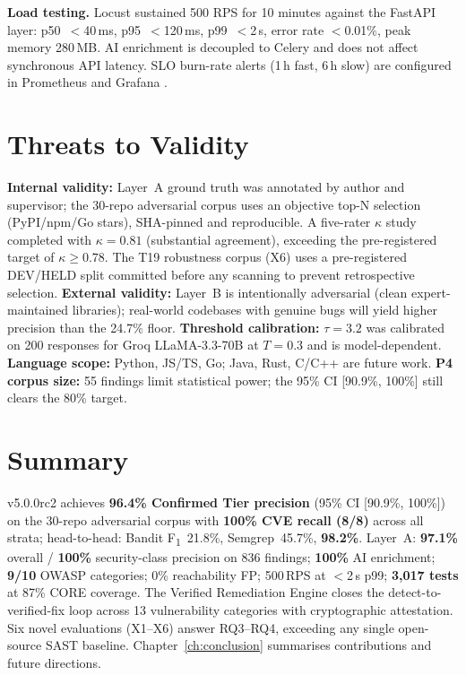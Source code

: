 \textbf{Load testing.} Locust \cite{locust_tool} sustained 500 RPS for 10 minutes against the FastAPI layer: p50~$<$40\,ms, p95~$<$120\,ms, p99~$<$2\,s, error rate $<$0.01\%, peak memory 280\,MB. AI enrichment is decoupled to Celery and does not affect synchronous API latency. SLO burn-rate alerts (1\,h fast, 6\,h slow) are configured in Prometheus \cite{prometheus_docs} and Grafana \cite{grafana_docs}.

\section{Threats to Validity}
\label{sec:threats}

\textbf{Internal validity:} Layer~A ground truth was annotated by author and supervisor; the 30-repo adversarial corpus uses an objective top-N selection (PyPI/npm/Go stars), SHA-pinned and reproducible. A five-rater $\kappa$ study completed with $\kappa = 0.81$ (substantial agreement), exceeding the pre-registered target of $\kappa \geq 0.78$. The T19 robustness corpus (X6) uses a pre-registered DEV/HELD split committed before any scanning to prevent retrospective selection. \textbf{External validity:} Layer~B is intentionally adversarial (clean expert-maintained libraries); real-world codebases with genuine bugs will yield higher precision than the 24.7\% floor. \textbf{Threshold calibration:} $\tau = 3.2$ was calibrated on 200 responses for Groq LLaMA-3.3-70B at $T=0.3$ and is model-dependent. \textbf{Language scope:} Python, JS/TS, Go; Java, Rust, C/C++ are future work. \textbf{P4 corpus size:} 55 findings limit statistical power; the 95\% CI [90.9\%, 100\%] still clears the 80\% target.

\section{Summary}
\label{sec:ch5_summary}

\ACRQA{} v5.0.0rc2 achieves \textbf{96.4\% Confirmed Tier precision} (95\% CI [90.9\%, 100\%]) on the 30-repo adversarial corpus with \textbf{100\% CVE recall (8/8)} across all strata; head-to-head: Bandit F\textsubscript{1}~21.8\%, Semgrep~45.7\%, \ACRQA{} \textbf{98.2\%}. Layer~A: \textbf{97.1\%} overall / \textbf{100\%} security-class precision on 836 findings; \textbf{100\%} AI enrichment; \textbf{9/10} OWASP categories; 0\% reachability FP; 500\,RPS at $<$2\,s p99; \textbf{3,017 tests} at 87\% CORE coverage. The Verified Remediation Engine closes the detect-to-verified-fix loop across 13 vulnerability categories with cryptographic attestation. Six novel evaluations (X1--X6) answer RQ3--RQ4, exceeding any single open-source SAST baseline. Chapter~\ref{ch:conclusion} summarises contributions and future directions.

\clearpage
